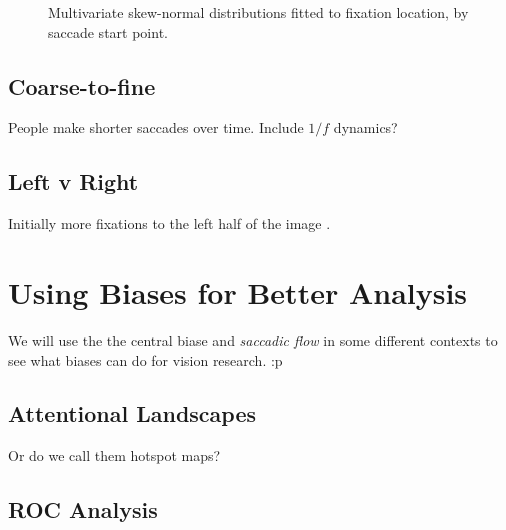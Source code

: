 \documentclass[a4paper, onecolumn, oneside, 11pt]{article}
\begin{document}
\begin{figure}
\caption{Multivariate skew-normal distributions fitted to fixation location, by saccade start point.}
\label{fig:exampleSkewNormal}
\end{figure}

\subsection{Coarse-to-fine}

People make shorter saccades over time. Include $1/f$ dynamics? 

\subsection{Left v Right}

Initially more fixations to the left half of the image \citep{nuthmann-matthias2014}.

\section{Using Biases for Better Analysis}

We will use the the central biase \citep{clarke-tatler2014} and \textit{saccadic flow} in some different contexts to see what biases can do for vision research. :p


\subsection{Attentional Landscapes}

Or do we call them hotspot maps?

\subsection{ROC Analysis}
\end{document}
